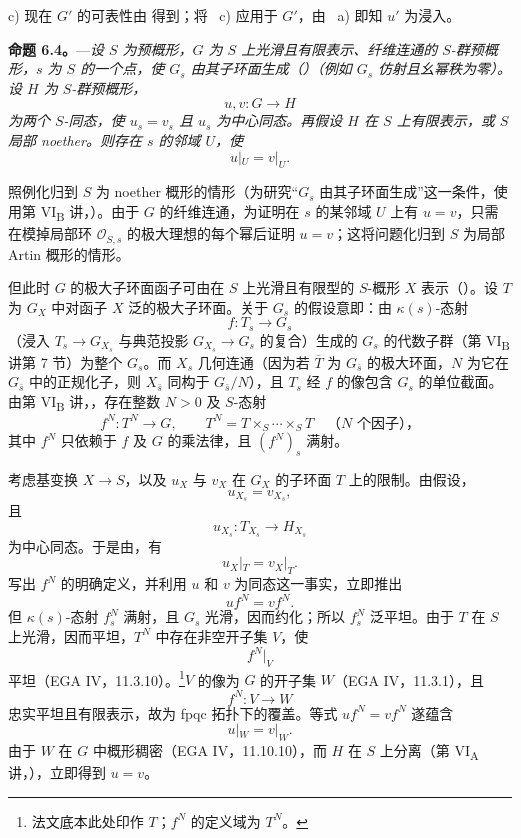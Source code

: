 \medskip
\noindent c) 现在 \(G'\) 的可表性由  得到；将 ~c) 应用于 \(G'\)，由 ~a) 即知 \(u'\) 为浸入。

\medskip
\noindent{}%
\textbf{命题 6.4。}---\textit{设 \(S\) 为预概形，\(G\) 为 \(S\) 上光滑且有限表示、纤维连通的 \(S\)-群预概形，\(s\) 为 \(S\) 的一个点，使 \(G_s\) 由其子环面生成（）（例如 \(G_s\) 仿射且幺幂秩为零）。设 \(H\) 为 \(S\)-群预概形，}
\[
  u,v:G\longrightarrow H
\]
\textit{为两个 \(S\)-同态，使 \(u_s=v_s\) 且 \(u_s\) 为中心同态。再假设 \(H\) 在 \(S\) 上有限表示，或 \(S\) 局部 noether。则存在 \(s\) 的邻域 \(U\)，使}
\[
  u|_U=v|_U.
\]

\medskip
照例化归到 \(S\) 为 noether 概形的情形（为研究“\(G_s\) 由其子环面生成”这一条件，使用第 VI\textsubscript{B} 讲，）。由于 \(G\) 的纤维连通，为证明在 \(s\) 的某邻域 \(U\) 上有 \(u=v\)，只需在模掉局部环 \(\mathcal O_{S,s}\) 的极大理想的每个幂后证明 \(u=v\)；这将问题化归到 \(S\) 为局部 Artin 概形的情形。

但此时 \(G\) 的极大子环面函子可由在 \(S\) 上光滑且有限型的 \(S\)-概形 \(X\) 表示（）。设 \(T\) 为 \(G_X\) 中对函子 \(X\) 泛的极大子环面。关于 \(G_s\) 的假设意即：由 \(\kappa(s)\)-态射
\[
  f:T_s\longrightarrow G_s
\]
（浸入 \(T_s\to G_{X_s}\) 与典范投影 \(G_{X_s}\to G_s\) 的复合）生成的 \(G_s\) 的代数子群（第 VI\textsubscript{B} 讲第 7 节）为整个 \(G_s\)。而 \(X_s\) 几何连通（因为若 \(\overline T\) 为 \(G_{\bar s}\) 的极大环面，\(N\) 为它在 \(G_{\bar s}\) 中的正规化子，则 \(X_{\bar s}\) 同构于 \(G_{\bar s}/N\)），且 \(T_s\) 经 \(f\) 的像包含 \(G_s\) 的单位截面。由第 VI\textsubscript{B} 讲，，存在整数 \(N>0\) 及 \(S\)-态射
\[
  f^N:T^N\longrightarrow G,
  \qquad
  T^N=T\times_S\cdots\times_S T
  \quad\text{（\(N\) 个因子），}
\]
其中 \(f^N\) 只依赖于 \(f\) 及 \(G\) 的乘法律，且 \((f^N)_s\) 满射。

考虑基变换 \(X\to S\)，以及 \(u_X\) 与 \(v_X\) 在 \(G_X\) 的子环面 \(T\) 上的限制。由假设，
\[
  u_{X_s}=v_{X_s},
\]
且
\[
  u_{X_s}:T_{X_s}\longrightarrow H_{X_s}
\]
为中心同态。于是由，有
\[
  u_X|_T=v_X|_T.
\]
写出 \(f^N\) 的明确定义，并利用 \(u\) 和 \(v\) 为同态这一事实，立即推出
\[
  uf^N=vf^N.
\]
但 \(\kappa(s)\)-态射 \(f_s^N\) 满射，且 \(G_s\) 光滑，因而约化；所以 \(f_s^N\) 泛平坦。由于 \(T\) 在 \(S\) 上光滑，因而平坦，\(T^N\) 中存在非空开子集 \(V\)，使
\[
  f^N|_V
\]
平坦（EGA IV，11.3.10）。\footnote{法文底本此处印作 \(T\)；\(f^N\) 的定义域为 \(T^N\)。}\(V\) 的像为 \(G\) 的开子集 \(W\)（EGA IV，11.3.1），且
\[
  f^N:V\longrightarrow W
\]
忠实平坦且有限表示，故为 fpqc 拓扑下的覆盖。等式 \(uf^N=vf^N\) 遂蕴含
\[
  u|_W=v|_W.
\]
由于 \(W\) 在 \(G\) 中概形稠密（EGA IV，11.10.10），而 \(H\) 在 \(S\) 上分离（第 VI\textsubscript{A} 讲，），立即得到 \(u=v\)。
